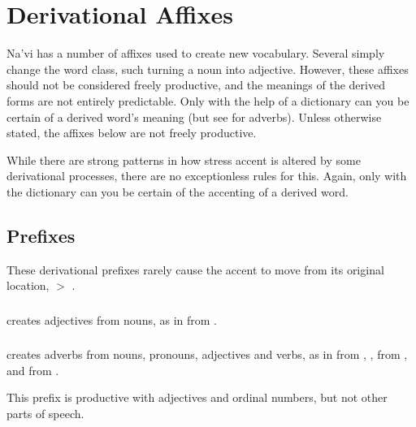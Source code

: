 
\section{Derivational Affixes}
\noindent Na'vi has a number of affixes used to create new vocabulary.
Several simply change the word class, such turning a noun into
adjective.  However, these affixes should not be considered freely
productive, and the meanings of the derived forms are not entirely
predictable.\label{lingop:affixes} Only with the help of a dictionary
can you be certain of a derived word's meaning (but see
 for adverbs).  Unless otherwise stated, the
affixes below are not freely productive.

\medskip
\noindent While there are strong patterns in how stress accent is
altered by some derivational processes, there are no exceptionless
rules for this.  Again, only with the dictionary can you be certain of
the accenting of a derived word.


\subsection{Prefixes} These derivational prefixes rarely cause the
accent to move from its original location,  $>$ .

\subsubsection{}  creates adjectives from nouns, as in
  from  .

\subsubsection{}  creates adverbs from nouns, pronouns,
adjectives and verbs, as in   from
,  ,   from
 , and   from 
. 

This prefix is productive with adjectives and ordinal numbers, but not
other parts of speech.


